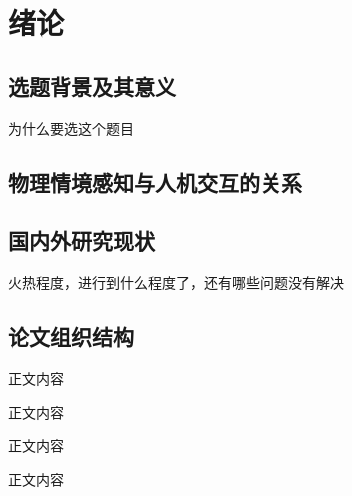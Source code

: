 \chapter{绪论}

\section{选题背景及其意义}

为什么要选这个题目


\section{物理情境感知与人机交互的关系}

\section{国内外研究现状}

火热程度，进行到什么程度了，还有哪些问题没有解决


\section{论文组织结构}
正文内容

正文内容

正文内容

正文内容








